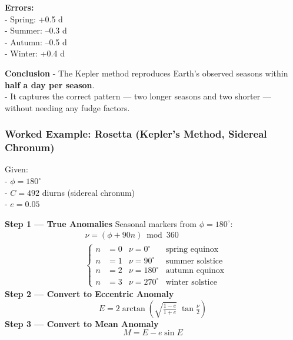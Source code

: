 \documentclass[
  letterpaper,
]{book}
\begin{document}
\textbf{Errors:}\\
- Spring: +0.5 d\\
- Summer: --0.3 d\\
- Autumn: --0.5 d\\
- Winter: +0.4 d

\textbf{Conclusion} - The Kepler method reproduces Earth's observed
seasons within \textbf{half a day per season}.\\
- It captures the correct pattern --- two longer seasons and two shorter
--- without needing any fudge factors.

\subsubsection{Worked Example: Rosetta (Kepler's Method, Sidereal
Chronum)}\label{worked-example-rosetta-keplers-method-sidereal-chronum}

Given:\\
- \(\phi = 180^\circ\)\\
- \(C = 492\) diurns (sidereal chronum)\\
- \(e = 0.05\)

\textbf{Step 1 --- True Anomalies} Seasonal markers from
\(\phi = 180^\circ\):\\
\[
\begin{gather}
&\nu = (\phi + 90n) \bmod 360 \\[1em]
&\begin{cases}
n &= 0 & \nu = 0^\circ & \text{spring equinox} \\
n &= 1 & \nu = 90^\circ & \text{summer solstice} \\
n &= 2 & \nu = 180^\circ & \text{autumn equinox} \\
n &= 3 & \nu = 270^\circ & \text{winter solstice}
\end{cases}
\end{gather}
\] \textbf{Step 2 --- Convert to Eccentric Anomaly} \[
E = 2 \arctan \!\left( \sqrt{\tfrac{1-e}{1+e}} \;\tan \tfrac{\nu}{2} \right)
\] \textbf{Step 3 --- Convert to Mean Anomaly} \[
M = E - e \sin E
\]
\end{document}
